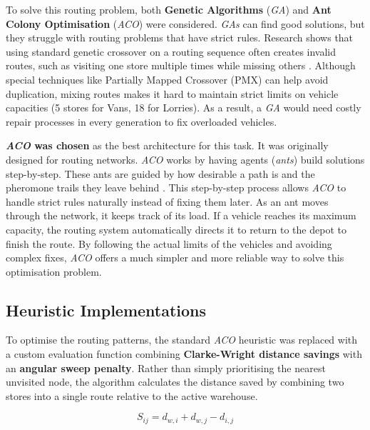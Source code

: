 \documentclass[12pt, a4paper]{article}
\begin{document}
\quad To solve this routing problem, both \textbf{Genetic Algorithms} (\textit{GA}) and \textbf{Ant Colony Optimisation} (\textit{ACO}) were considered. \textit{GAs} can find good solutions, but they struggle with routing problems that have strict rules. Research shows that using standard genetic crossover on a routing sequence often creates invalid routes, such as visiting one store multiple times while missing others \cite{Luke2013Metaheuristics}. Although special techniques like Partially Mapped Crossover (PMX) can help avoid duplication, mixing routes makes it hard to maintain strict limits on vehicle capacities (5 stores for Vans, 18 for Lorries). As a result, a \textit{GA} would need costly repair processes in every generation to fix overloaded vehicles.

\vspace{0.5cm}

\textbf{\textit{ACO} was chosen} as the best architecture for this task. It was originally designed for routing networks. \textit{ACO} works by having agents (\textit{ants}) build solutions step-by-step. These ants are guided by how desirable a path is and the pheromone trails they leave behind \cite{Luke2013Metaheuristics}. This step-by-step process allows \textit{ACO} to handle strict rules naturally instead of fixing them later. As an ant moves through the network, it keeps track of its load. If a vehicle reaches its maximum capacity, the routing system automatically directs it to return to the depot to finish the route. By following the actual limits of the vehicles and avoiding complex fixes, \textit{ACO} offers a much simpler and more reliable way to solve this optimisation problem.

\vspace{0.5cm}

\subsection{Heuristic Implementations}

\quad To optimise the routing patterns, the standard \textit{ACO} heuristic was replaced with a custom evaluation function combining \textbf{Clarke-Wright distance savings} with an \textbf{angular sweep penalty}. Rather than simply prioritising the nearest unvisited node, the algorithm calculates the distance saved by combining two stores into a single route relative to the active warehouse.

$$S_{ij} = d_{w,i} + d_{w,j} - d_{i,j}$$
\end{document}

